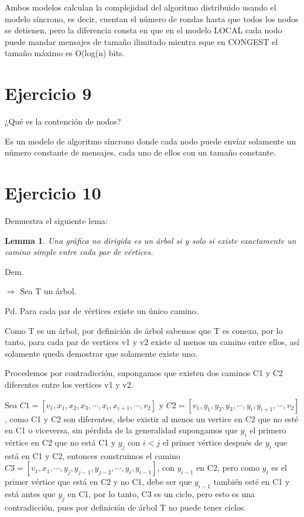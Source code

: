 \documentclass{article}
\newtheorem{lemma}[theorem]{Lemma}
\begin{document}
Ambos modelos calculan la complejidad del algoritmo distribuido usando el modelo síncrono, es decir, cuentan el número de rondas hasta que todos los nodos se detienen, pero la diferencia consta en que en el modelo LOCAL cada nodo puede mandar mensajes de tamaño ilimitado mientra sque en CONGEST el tamaño máximo es O(log(n) bits.
\section*{Ejercicio 9}
¿Qué es la contención de nodos?

Es un modelo de algoritmo síncrono donde cada nodo puede envíar solamente un número constante de mensajes, cada uno de ellos con un tamaño constante.
\section*{Ejercicio 10}
Demuestra el siguiente lema:

\begin{lemma}
Una gráfica no dirigida es un árbol si y solo si existe exactamente un camino simple entre cada par de vértices.
\end{lemma}

Dem.

$\Rightarrow$ Sea T un árbol.

Pd. Para cada par de vértices existe un único camino.

Como T es un árbol, por definición de árbol sabemos que T es conexo, por lo tanto, para cada par de vertices v1 y v2 existe al menos un camino entre ellos, así solamente queda demostrar que solamente existe uno.

Procedemos por contradicción, supongamos que existen dos caminos C1 y C2 diferentes entre los vertices v1 y v2.

Sea $C1=[v_1,x_1,x_2,x_3,\cdots,x_i,x_{i+1},\cdots,v_2]$ y $C2=[v_1,y_1,y_2,y_3,\cdots,y_i,y_{i+1},\cdots,v_2]$, como C1 y C2 son diferentes, debe existir al menos un vertice en C2 que no esté en C1 o viceversa, sin pérdida de la generalidad supongamos que $y_i$ el primero vértice en C2 que no está C1 y $y_j$ con $i<j$ el primer vértice después de $y_i$ que está en C1 y C2, entonces construimos el camino $C3=[v_1,x_1,\cdots,y_{j},y_{j-1},y_{j-2},\cdots,y_{i},y_{i-1}]$, con $y_{i-1}$ en C2, pero como $y_i$ es el primer vértice que está en C2 y no C1, debe ser que $y_{i-1}$ también esté en C1 y está antes que $y_j$ en C1, por lo tanto, C3 es un ciclo, pero esto es una contradicción, pues por definición de árbol T no puede tener ciclos.
\end{document}
